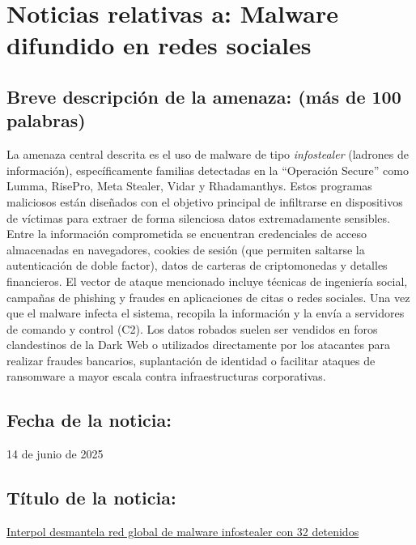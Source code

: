 \chapter{Noticias relativas a: Malware difundido en redes sociales}


    \section{Breve descripción de la amenaza: (más de 100 palabras)}

    La amenaza central descrita es el uso de malware de tipo \textit{infostealer} 
    (ladrones de información), específicamente familias detectadas en la ``Operación Secure'' 
    como Lumma, RisePro, Meta Stealer, Vidar y Rhadamanthys. Estos programas maliciosos están 
    diseñados con el objetivo principal de infiltrarse en 
    dispositivos de víctimas para extraer de forma 
    silenciosa datos extremadamente sensibles. Entre la 
    información comprometida se encuentran credenciales
     de acceso almacenadas en navegadores, cookies de 
     sesión (que permiten saltarse la autenticación de 
     doble factor), datos de carteras de criptomonedas 
     y detalles financieros. El vector de ataque 
     mencionado incluye técnicas de ingeniería social, 
     campañas de phishing y fraudes en aplicaciones de 
     citas o redes sociales. Una vez que el malware 
     infecta el sistema, recopila la información y la 
     envía a servidores de comando y control (C2). 
     Los datos robados suelen ser vendidos en foros 
     clandestinos de la Dark Web o utilizados directamente 
     por los atacantes para realizar fraudes bancarios, 
     suplantación de identidad o facilitar ataques de 
     ransomware a mayor escala contra infraestructuras 
     corporativas.


    \section{Fecha de la noticia:}

    14 de junio de 2025

    \section{Título de la noticia:}

    \href{https://www.escudodigital.com/ciberseguridad/operacion-secure-infostealer.html}{Interpol desmantela red global de malware infostealer con 32 detenidos}

